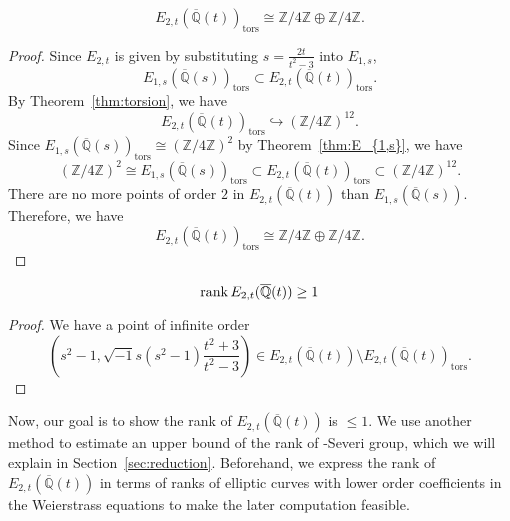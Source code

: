 \documentclass[main]{subfiles}
\begin{document}
\begin{lem}
    \begin{equation*}
        E_{2,t}(\overline{\mathbb{Q}}(t))_{\text{tors}} \cong \mathbb{Z} / 4 \mathbb{Z} \oplus \mathbb{Z} / 4 \mathbb{Z}.
    \end{equation*}
\end{lem}
\begin{proof}
    Since $E_{2,t}$ is given by substituting $s = \frac{2t}{t^{2} - 3}$ into $E_{1,s}$,
    \begin{equation*}
        E_{1,s}(\overline{\mathbb{Q}}(s))_{\text{tors}} \subset E_{2,t}(\overline{\mathbb{Q}}(t))_{\text{tors}}.
    \end{equation*}
    By Theorem~\ref{thm:torsion}, we have
    \begin{equation*}
        E_{2,t}(\overline{\mathbb{Q}}(t))_{\text{tors}} \hookrightarrow (\mathbb{Z} / 4 \mathbb{Z})^{12}.
    \end{equation*}
    Since $E_{1,s}(\overline{\mathbb{Q}}(s))_{\text{tors}} \cong (\mathbb{Z} / 4 \mathbb{Z})^2$ by Theorem~\ref{thm:E_{1,s}}, we have
    \begin{equation*}
        (\mathbb{Z} / 4 \mathbb{Z})^2 \cong E_{1,s}(\overline{\mathbb{Q}}(s))_{\text{tors}} \subset E_{2,t}(\overline{\mathbb{Q}}(t))_{\text{tors}} \subset (\mathbb{Z} / 4 \mathbb{Z})^{12}.
    \end{equation*}
    There are no more points of order $2$ in $E_{2,t}(\overline{\mathbb{Q}}(t))$ than $E_{1,s}(\overline{\mathbb{Q}}(s))$.
    Therefore, we have
    \begin{equation*}
        E_{2,t}(\overline{\mathbb{Q}}(t))_{\text{tors}} \cong \mathbb{Z} / 4 \mathbb{Z} \oplus \mathbb{Z} / 4 \mathbb{Z}.
    \end{equation*}
\end{proof}

\begin{lem}
    \begin{equation*}
        \operatorname{rank} E_{2,t}(\overline{\mathbb{Q}}(t)) \geq 1
    \end{equation*}
\end{lem}
\begin{proof}
    We have a point of infinite order
    \begin{equation*}
        \left(s^{2} - 1, \sqrt{-1} s(s^{2} - 1) \frac{t^{2} + 3}{t^{2} - 3} \right) \in E_{2,t}(\overline{\mathbb{Q}}(t)) \setminus E_{2,t}(\overline{\mathbb{Q}}(t))_{\text{tors}}.
    \end{equation*}
\end{proof}
Now, our goal is to show the rank of $E_{2,t}(\overline{\mathbb{Q}}(t))$ is $\leq 1$.
We use another method to estimate an upper bound of the rank of \Neron-Severi group, which we will explain in Section~\ref{sec:reduction}.
Beforehand, we express the rank of $E_{2,t}(\overline{\mathbb{Q}}(t))$ in terms of ranks of elliptic curves with lower order coefficients in the Weierstrass equations to make the later computation feasible.
\end{document}
